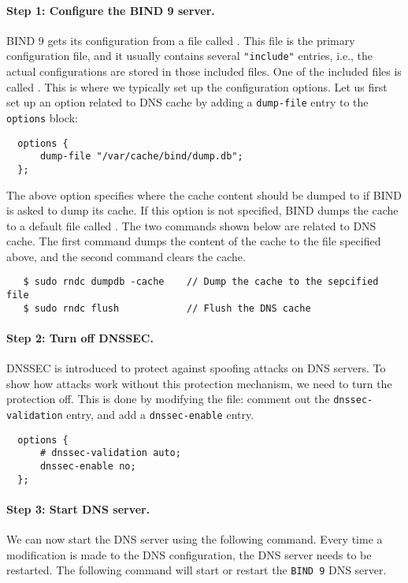 \paragraph{Step 1: Configure the BIND 9 server.}
BIND 9 gets its configuration from a file called . This file
is the primary configuration file, and it usually contains several \texttt{"include"}
entries, i.e., the actual configurations are stored in those included files. One of the
included files is called . This is where we typically set up
the configuration options. Let us first set up an option related to DNS cache by adding
a \texttt{dump-file} entry to the \texttt{options} block:

\begin{lstlisting}
  options {
      dump-file "/var/cache/bind/dump.db";
  };
\end{lstlisting}


The above option specifies where the cache content should be dumped to if BIND is asked to dump
its cache.  If this option is not specified, BIND dumps the cache to a default file
called .
The two commands shown below are related to DNS cache.
The first command dumps the content of the cache to the file specified above, and
the second command clears the cache.

\begin{lstlisting}
   $ sudo rndc dumpdb -cache    // Dump the cache to the sepcified file
   $ sudo rndc flush            // Flush the DNS cache
\end{lstlisting}


\paragraph{Step 2: Turn off DNSSEC.}
DNSSEC is introduced to protect against spoofing attacks on DNS servers.
To show how attacks work
without this protection mechanism, we need to turn the protection off.
This is done by modifying the  file:
comment out the {\tt dnssec-validation} entry, and
add a {\tt dnssec-enable} entry.

\begin{lstlisting}
  options {
      # dnssec-validation auto;
      dnssec-enable no;
  };
\end{lstlisting}


\paragraph{Step 3: Start DNS server.}
We can now start the DNS server using the following command. Every time
a modification is made to the DNS configuration, the DNS server needs to be
restarted. The following command will start or restart the \texttt{BIND 9}
DNS server.


